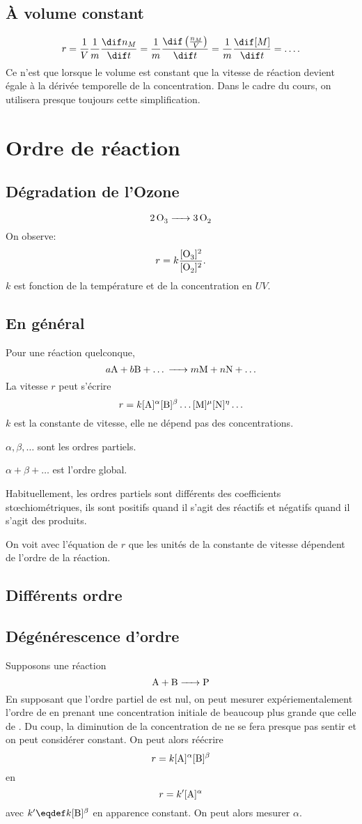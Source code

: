 \subsection{À volume constant}
\[ r = \frac 1V \frac 1m \frac {\dif n_M}{\dif t} =
  \frac 1m \frac {\dif \left(\frac {n_M}V\right)}{\dif t} =
  \frac 1m \frac {\dif [M]}{\dif t} = \ldots. \]
Ce n'est que lorsque le volume est constant que la vitesse de
réaction devient égale à la dérivée temporelle de la concentration.
Dans le cadre du cours, on utilisera presque toujours cette simplification.

\section{Ordre de réaction}
\subsection{Dégradation de l'Ozone}
\[ \ce{2O3} \ce{->} \ce{3O2} \]
On observe:
\[  r = k \frac{[\ce{O_3}]^2}{[\ce{O_2}]^2}. \]
$k$ est fonction de la température et de la concentration en $UV$.

\subsection{En général}
Pour une réaction quelconque,
\[ a\ce{A}+b\ce{B}+\ldots \ce{->} m\ce{M} + n\ce{N} + \ldots \]
La vitesse $r$ peut s'écrire
\[  r = k[\ce{A}]^{\alpha}[\ce{B}]^{\beta}
\ldots[\ce{M}]^{\mu}[\ce{N}]^{\eta}\ldots \]
$k$ est la constante de vitesse, elle ne dépend pas des concentrations.

$\alpha,\beta,\ldots$ sont les ordres partiels.

$\alpha+\beta+\ldots$ est l'ordre global.

Habituellement, les ordres partiels sont différents
des coefficients stœchiométriques,
ils sont positifs quand il s'agit des réactifs et
négatifs quand il s'agit des produits.

On voit avec l'équation de $r$ que les unités de
la constante de vitesse dépendent de l'ordre de la réaction.

\subsection{Différents ordre}
\subsection{Dégénérescence d'ordre}
Supposons une réaction
\[ \ce{A + B -> P} \]
En supposant que l'ordre partiel de  est nul,
on peut mesurer expériementalement l'ordre de 
en prenant une concentration initiale de  beaucoup plus
grande que celle de .
Du coup, la diminution de la concentration de  ne se fera
presque pas sentir et on peut considérer \ce{[B]} constant.
On peut alors réécrire
\[ r = k[\ce{A}]^\alpha [\ce{B}]^\beta \]
en
\[ r = k'[\ce{A}]^\alpha \]
avec $k'\eqdef k[\ce{B}]^\beta$ en apparence constant.
On peut alors mesurer $\alpha$.

